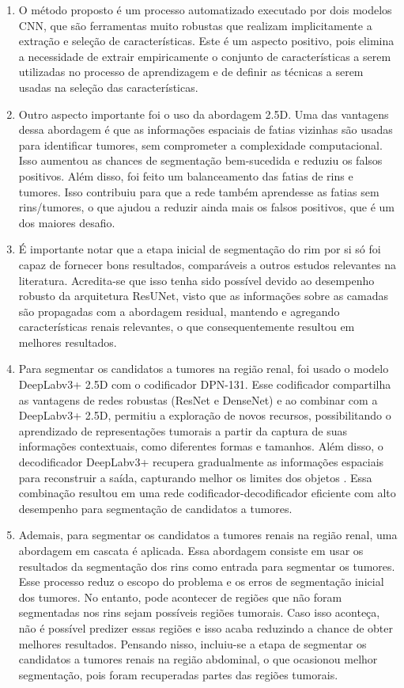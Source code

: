 \begin{enumerate}
    \item O método proposto é um processo automatizado executado por dois modelos CNN, que são ferramentas muito robustas que realizam implicitamente a extração e seleção de características. Este é um aspecto positivo, pois elimina a necessidade de extrair empiricamente o conjunto de características a serem utilizadas no processo de aprendizagem e de definir as técnicas a serem usadas na seleção das características.
    
    \item Outro aspecto importante foi o uso da abordagem 2.5D. Uma das vantagens dessa abordagem é que as informações espaciais de fatias vizinhas são usadas para identificar tumores, sem comprometer a complexidade computacional. Isso aumentou as chances de segmentação bem-sucedida e reduziu os falsos positivos. Além disso, foi feito um balanceamento das fatias de rins e tumores. Isso contribuiu para que a rede também aprendesse as fatias sem rins/tumores, o que ajudou a reduzir ainda mais os falsos positivos, que é um dos maiores desafio.
    
    \item É importante notar que a etapa inicial de segmentação do rim por si só foi capaz de fornecer bons resultados, comparáveis a outros estudos relevantes na literatura. Acredita-se que isso tenha sido possível devido ao desempenho robusto da arquitetura ResUNet, visto que as informações sobre as camadas são propagadas com a abordagem residual, mantendo e agregando características renais relevantes, o que consequentemente resultou em melhores resultados.
    
    \item Para segmentar os candidatos a tumores na região renal, foi usado o modelo DeepLabv3+ 2.5D com o codificador DPN-131. Esse codificador compartilha as vantagens de redes robustas (ResNet e DenseNet) \cite{chen2017dual} e ao combinar com a DeepLabv3+ 2.5D, permitiu a exploração de novos recursos, possibilitando o aprendizado de representações tumorais a partir da captura de suas informações contextuais, como diferentes formas e tamanhos. Além disso, o decodificador DeepLabv3+ recupera gradualmente as informações espaciais para reconstruir a saída, capturando melhor os limites dos objetos \cite{chen2018encoder}. Essa combinação resultou em uma rede codificador-decodificador eficiente com alto desempenho para segmentação de candidatos a tumores.
    
    \item Ademais, para segmentar os candidatos a tumores renais na região renal, uma abordagem em cascata é aplicada. Essa abordagem consiste em usar os resultados da segmentação dos rins como entrada para segmentar os tumores. Esse processo reduz o escopo do problema e os erros de segmentação inicial dos tumores. No entanto, pode acontecer de regiões que não foram segmentadas nos rins sejam possíveis regiões tumorais. Caso isso aconteça, não é possível predizer essas regiões e isso acaba reduzindo a chance de obter melhores resultados. Pensando nisso, incluiu-se a etapa de segmentar os candidatos a tumores renais na região abdominal, o que ocasionou melhor segmentação, pois foram recuperadas partes das regiões tumorais.
    

\end{enumerate}
